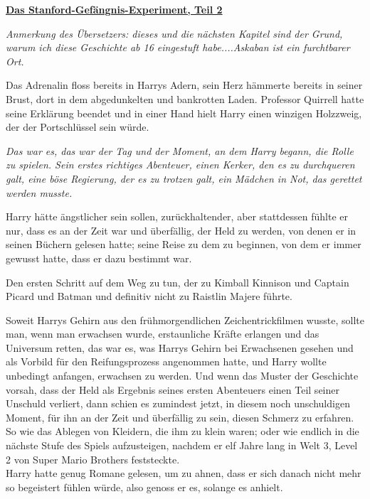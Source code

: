 

\hypertarget{das-stanford-gefuxe4ngnis-experiment-teil-2}{%

\textbf{\uline{Das Stanford-Gefängnis-Experiment, Teil 2}}

\hfill\break \emph{Anmerkung des Übersetzers: dieses und die nächsten Kapitel sind der Grund, warum ich diese Geschichte ab 16 eingestuft habe....Askaban ist ein furchtbarer Ort.}

Das Adrenalin floss bereits in Harrys Adern, sein Herz hämmerte bereits in seiner Brust, dort in dem abgedunkelten und bankrotten Laden. Professor Quirrell hatte seine Erklärung beendet und in einer Hand hielt Harry einen winzigen Holzzweig, der der Portschlüssel sein würde.

\emph{Das war es, das war der Tag und der Moment, an dem Harry begann, die Rolle zu spielen. Sein erstes richtiges Abenteuer, einen Kerker, den es zu durchqueren galt, eine böse Regierung, der es zu trotzen galt, ein Mädchen in Not, das gerettet werden musste.}

Harry hätte ängstlicher sein sollen, zurückhaltender, aber stattdessen fühlte er nur, dass es an der Zeit war und überfällig, der Held zu werden, von denen er in seinen Büchern gelesen hatte; seine Reise zu dem zu beginnen, von dem er immer gewusst hatte, dass er dazu bestimmt war.

Den ersten Schritt auf dem Weg zu tun, der zu Kimball Kinnison und Captain Picard und Batman und definitiv nicht zu Raistlin Majere führte.

Soweit Harrys Gehirn aus den frühmorgendlichen Zeichentrickfilmen wusste, sollte man, wenn man erwachsen wurde, erstaunliche Kräfte erlangen und das Universum retten, das war es, was Harrys Gehirn bei Erwachsenen gesehen und als Vorbild für den Reifungsprozess angenommen hatte, und Harry wollte unbedingt anfangen, erwachsen zu werden. Und wenn das Muster der Geschichte vorsah, dass der Held als Ergebnis seines ersten Abenteuers einen Teil seiner Unschuld verliert, dann schien es zumindest jetzt, in diesem noch unschuldigen Moment, für ihn an der Zeit und überfällig zu sein, diesen Schmerz zu erfahren. So wie das Ablegen von Kleidern, die ihm zu klein waren; oder wie endlich in die nächste Stufe des Spiels aufzusteigen, nachdem er elf Jahre lang in Welt 3, Level 2 von Super Mario Brothers feststeckte.\\ Harry hatte genug Romane gelesen, um zu ahnen, dass er sich danach nicht mehr so begeistert fühlen würde, also genoss er es, solange es anhielt.

}
